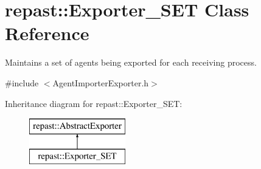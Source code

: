 \hypertarget{classrepast_1_1_exporter___s_e_t}{\section{repast\-:\-:Exporter\-\_\-\-S\-E\-T Class Reference}
\label{classrepast_1_1_exporter___s_e_t}
}


Maintains a set of agents being exported for each receiving process.  




{\ttfamily \#include $<$Agent\-Importer\-Exporter.\-h$>$}

Inheritance diagram for repast\-:\-:Exporter\-\_\-\-S\-E\-T\-:\begin{figure}[H]
\begin{center}
\leavevmode
\includegraphics[height=2.000000cm]{classrepast_1_1_exporter___s_e_t}
\end{center}
\end{figure}
